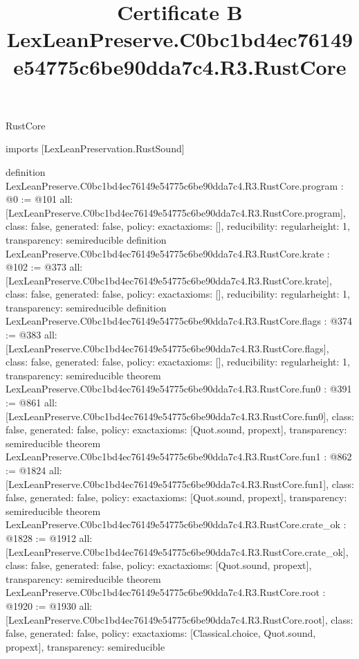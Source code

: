 \begin{lexlean}{RustCore}
\title{Certificate B LexLeanPreserve.C0bc1bd4ec76149e54775c6be90dda7c4.R3.RustCore}
\begin{coremodule}
imports [LexLeanPreservation.RustSound]

definition LexLeanPreserve.C0bc1bd4ec76149e54775c6be90dda7c4.R3.RustCore.program : @0 := @101 {
  all: [LexLeanPreserve.C0bc1bd4ec76149e54775c6be90dda7c4.R3.RustCore.program],
  class: false,
  generated: false,
  policy: exact{axioms: []},
  reducibility: regular{height: 1},
  transparency: semireducible
}
definition LexLeanPreserve.C0bc1bd4ec76149e54775c6be90dda7c4.R3.RustCore.krate : @102 := @373 {
  all: [LexLeanPreserve.C0bc1bd4ec76149e54775c6be90dda7c4.R3.RustCore.krate],
  class: false,
  generated: false,
  policy: exact{axioms: []},
  reducibility: regular{height: 1},
  transparency: semireducible
}
definition LexLeanPreserve.C0bc1bd4ec76149e54775c6be90dda7c4.R3.RustCore.flags : @374 := @383 {
  all: [LexLeanPreserve.C0bc1bd4ec76149e54775c6be90dda7c4.R3.RustCore.flags],
  class: false,
  generated: false,
  policy: exact{axioms: []},
  reducibility: regular{height: 1},
  transparency: semireducible
}
theorem LexLeanPreserve.C0bc1bd4ec76149e54775c6be90dda7c4.R3.RustCore.fun0 : @391 := @861 {
  all: [LexLeanPreserve.C0bc1bd4ec76149e54775c6be90dda7c4.R3.RustCore.fun0],
  class: false,
  generated: false,
  policy: exact{axioms: [Quot.sound, propext]},
  transparency: semireducible
}
theorem LexLeanPreserve.C0bc1bd4ec76149e54775c6be90dda7c4.R3.RustCore.fun1 : @862 := @1824 {
  all: [LexLeanPreserve.C0bc1bd4ec76149e54775c6be90dda7c4.R3.RustCore.fun1],
  class: false,
  generated: false,
  policy: exact{axioms: [Quot.sound, propext]},
  transparency: semireducible
}
theorem LexLeanPreserve.C0bc1bd4ec76149e54775c6be90dda7c4.R3.RustCore.crate_ok : @1828 := @1912 {
  all: [LexLeanPreserve.C0bc1bd4ec76149e54775c6be90dda7c4.R3.RustCore.crate_ok],
  class: false,
  generated: false,
  policy: exact{axioms: [Quot.sound, propext]},
  transparency: semireducible
}
theorem LexLeanPreserve.C0bc1bd4ec76149e54775c6be90dda7c4.R3.RustCore.root : @1920 := @1930 {
  all: [LexLeanPreserve.C0bc1bd4ec76149e54775c6be90dda7c4.R3.RustCore.root],
  class: false,
  generated: false,
  policy: exact{axioms: [Classical.choice, Quot.sound, propext]},
  transparency: semireducible
}


\end{coremodule}
\end{lexlean}
